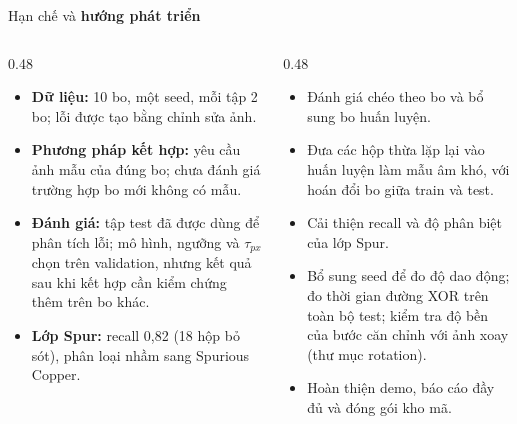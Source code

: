 \documentclass[aspectratio=169,11pt,t]{beamer}
\newcommand{\mycode}[1]{{\ttfamily\color{codeinl}#1}}
\newcommand{\hl}[1]{{\bfseries\color{coral}#1}}
\begin{document}
\begin{frame}{Hạn chế và \hl{hướng phát triển}}
  \footnotesize
  \begin{columns}[T,onlytextwidth]
    \begin{column}{0.48\textwidth}
      \begin{trap}
        \begin{itemize}\setlength{\itemsep}{1pt}
          \item \textbf{Dữ liệu:} 10 bo, một seed, mỗi tập 2 bo; lỗi được tạo bằng chỉnh sửa ảnh.
          \item \textbf{Phương pháp kết hợp:} yêu cầu ảnh mẫu của đúng bo; chưa đánh giá trường hợp bo mới không có mẫu.
          \item \textbf{Đánh giá:} tập test đã được dùng để phân tích lỗi; mô hình, ngưỡng và $\tau_{px}$ chọn trên validation, nhưng kết quả sau khi kết hợp cần kiểm chứng thêm trên bo khác.
          \item \textbf{Lớp Spur:} recall 0,82 (18 hộp bỏ sót), phân loại nhầm sang Spurious Copper.
        \end{itemize}
      \end{trap}
    \end{column}
    \begin{column}{0.48\textwidth}
      \begin{key}
        \begin{itemize}\setlength{\itemsep}{1pt}
          \item Đánh giá chéo theo bo và bổ sung bo huấn luyện.
          \item Đưa các hộp thừa lặp lại vào huấn luyện làm mẫu âm khó, với hoán đổi bo giữa train và test.
          \item Cải thiện recall và độ phân biệt của lớp Spur.
          \item Bổ sung seed để đo độ dao động; đo thời gian đường XOR trên toàn bộ test; kiểm tra độ bền của bước căn chỉnh với ảnh xoay (thư mục \mycode{rotation}).
          \item Hoàn thiện demo, báo cáo đầy đủ và đóng gói kho mã.
        \end{itemize}
      \end{key}
    \end{column}
  \end{columns}
\end{frame}
\end{document}
